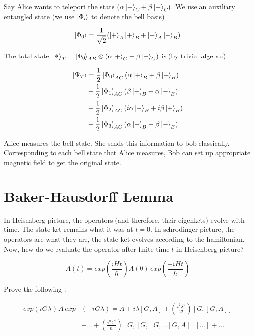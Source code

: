 \documentclass{report}
\begin{document}
\noindent Say Alice wants to teleport the state $(\alpha\ket{+}_C+\beta\ket{-}_C)$. We use an auxiliary entangled state (we use ${\ket{\Phi_i}}$ to denote the bell basis)

$$\ket{\Phi_0} = \frac{1}{\sqrt{2}}(\ket{+}_A \ket{+}_B + \ket{-}_A\ket{-}_B)$$

\noindent The total state $\ket{\Psi}_{T} = \ket{\Phi_0}_{AB}\otimes (\alpha\ket{+}_C+\beta\ket{-}_C)$ is (by trivial algebra)

\begin{align}
  \ket{\Psi_T} &= \frac{1}{2}\ket{\Phi_0}_{AC}(\alpha\ket{+}_B + \beta\ket{-}_{B})\\
                                   & + \frac{1}{2}\ket{\Phi_1}_{AC}(\beta\ket{+}_B + \alpha\ket{-}_{B})\nonumber\\
                                   & + \frac{1}{2}\ket{\Phi_2}_{AC}(i\alpha\ket{-}_B + i\beta\ket{+}_{B})\nonumber\\
                                   & + \frac{1}{2}\ket{\Phi_3}_{AC}(\alpha\ket{+}_B - \beta\ket{-}_{B})\nonumber
\end{align}

\noindent Alice measures the bell state. She sends this information to bob classically. Corresponding to each bell state that Alice measures, Bob can set up appropriate magnetic field to get the original state.

\section{Baker-Hausdorff Lemma}

In Heisenberg picture, the operators (and therefore, their eigenkets) evolve with time. The state ket remains what it was at $t=0$. In schrodinger picture, the operators are what they are, the state ket evolves according to the hamiltonian. Now, how do we evaluate the operator after finite time $t$ in Heisenberg picture?

$$A(t) = exp\left(\frac{iHt}{\hbar}\right)A(0)\,exp\left(\frac{-iHt}{\hbar}\right)$$

Prove the following :

\begin{align}
  exp(iG\lambda)\,A\,exp&(-iG\lambda) = A + i\lambda[G,A] + \left(\frac{i^2\lambda^2}{2!}\right)[G,[G,A]]\\
                    & +...+\left(\frac{i^n\lambda^n}{n!}\right)[G,[G,[G,...[G,A]]]...]+...\nonumber
\end{align}
\end{document}

